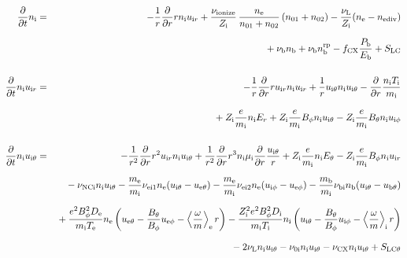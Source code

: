 \documentclass[11pt]{article}
\def\r#1{{\rm#1}}
\def\ddt{\frac{\partial}{\partial t}}
\def\ddr{\frac{\partial}{\partial r}}
\def\ave#1{\left\langle#1\right\rangle}
\def\me{m_\r{e}}
\def\mi{m_\r{i}}
\def\mb{m_\r{b}}
\def\mue{\mu_\r{e}}
\def\mui{\mu_\r{i}}
\def\De{D_\r{e}}
\def\Di{D_\r{i}}
\def\ne{n_\r{e}}
\def\ni{n_\r{i}}
\def\nb{n_\r{b}}
\def\uir{u_{\r{i}r}}
\def\ueth{u_{\r{e}\theta}}
\def\uith{u_{\r{i}\theta}}
\def\ubth{u_{\r{b}\theta}}
\def\ueph{u_{\r{e}\phi}}
\def\uiph{u_{\r{i}\phi}}
\def\Er{E_r}
\def\Eth{E_\theta}
\def\Bth{B_\theta}
\def\Bph{B_\phi}
\def\Te{T_\r{e}}
\def\Ti{T_\r{i}}
\def\nna{n_{01}}
\def\nnb{n_{02}}
\def\Zi{Z_\r{i}}
\def\Pb{P_\r{b}}
\def\Eb{E_\r{b}}
\def\nbrp{n_\r{b}^\r{rp}}
\def\fCX{f_\r{CX}}
\def\nuNCi{\nu_\r{NCi}}
\def\nuni{\nu_\r{0i}}
\def\nuL{\nu_\r{L}}
\def\nuCX{\nu_\r{CX}}
\def\nuion{\nu_\r{ionize}}
\def\nub{\nu_\r{b}}
\def\nediv{n_\r{ediv}}
\newcommand{\Frac}[2]{%
  {\displaystyle {\displaystyle #1\over \displaystyle #2}}%
}
\newcommand{\rdprd}[2]{\Frac{\partial #1}{\partial #2}}
\newcommand{\aveaveB}[1]{\left< \!\! \left< #1 \right> \!\! \right>}
\begin{document}
\begin{eqnarray}
%
%
  \ddt\ni &=&
%
  - \frac{1}{r} \ddr r \ni \uir
%
  + \frac{\nuion}{\Zi}\, \frac{\ne}{\nna+\nnb}\, (\nna+\nnb)
%
  - \frac{\nuL}{\Zi} (\ne - \nediv) 
\nonumber\\[2.5mm]&&{}
%
  + \nub \nb
%
  + \nub \nbrp
%
  - \fCX \frac{\Pb}{\Eb}
%
  + S_\r{LC}
\\[5mm]
%
%
  \ddt \ni \uir &=&
%
  - \frac{1}{r} \ddr r \uir \ni \uir
%
  + \frac{1}{r} \uith \ni \uith
%
  - \ddr \frac{\ni \Ti}{\mi}
\nonumber\\[3mm]&&{}
%
  + \Zi \frac{e}{\mi}\ni \Er
%
  + \Zi \frac{e}{\mi} \Bph \ni \uith
%
  - \Zi \frac{e}{\mi} \Bth \ni \uiph
\\[5mm]
%
%
  \ddt \ni \uith &=&
%
  - \frac{1}{r^2} \ddr r^2 \uir \ni \uith
%
  + \frac{1}{r^2} \ddr r^3 \ni \mui \ddr \frac{\uith}{r}
%
  + \Zi \frac{e}{\mi} \ni \Eth
%
  - \Zi \frac{e}{\mi} \Bph \ni \uir
\nonumber\\[2.5mm]&&{}
%
  - \nuNCi \ni \uith
%
  - \frac{\me}{\mi} \nu_\r{ei1} \ne (\uith - \ueth)
%
  - \frac{\me}{\mi} \nu_\r{ei2} \ne (\uiph - \ueph)
%
  - \frac{\mb}{\mi} \nu_\r{bi} \nb (\uith - \ubth)
\nonumber\\[2.5mm]&&{}
%
  + \frac{e^2 \Bph^2 \De}{\mi\Te}\ne
    \left(\ueth - \frac{\Bth}{\Bph}\ueph - \ave{\frac{\omega}{m}}_\r{e}
     r \right)
%
  - \frac{\Zi^2 e^2 \Bph^2 \Di}{\mi\Ti}\ni
    \left(\uith - \frac{\Bth}{\Bph}\uiph - \ave{\frac{\omega}{m}}_\r{i}
     r \right)
%
\nonumber\\[2.5mm]&&{}
%
  - 2 \nuL \ni \uith
%
  - \nuni \ni \uith
%
  - \nuCX \ni \uith
%
  + S_\r{LC\theta}
%
%
\\[5mm]
%

\end{eqnarray}
\end{document}
